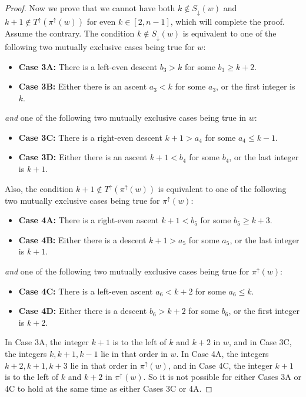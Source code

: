 \documentclass[11pt]{amsart}
\theoremstyle{definition}
\begin{document}
\begin{proof}
    Now we prove that we cannot have both $k\not\in S_\downarrow(w)$ and $k+1\not\in T^\uparrow(\pi^\uparrow(w))$ for even $k\in [2,n-1]$, which will complete the proof. Assume the contrary. The condition $k\not\in S_\downarrow(w)$ is equivalent to one of the following two mutually exclusive cases being true for $w$:
    \begin{itemize}
        \item \textbf{Case 3A: } There is a left-even descent $b_3>k$ for some $b_3\ge k+2$.
        \item \textbf{Case 3B: } Either there is an ascent $a_3<k$ for some $a_3$, or the first integer is $k$.
    \end{itemize}
    \emph{and} one of the following two mutually exclusive cases being true in $w$:
    \begin{itemize}
        \item \textbf{Case 3C: } There is a right-even descent $k+1>a_4$ for some $a_4\le k-1$.
        \item \textbf{Case 3D: } Either there is an ascent $k+1<b_4$ for some $b_4$, or the last integer is $k+1$.
    \end{itemize}
    Also, the condition $k+1\not\in T^\uparrow(\pi^\uparrow(w))$ is equivalent to one of the following two mutually exclusive cases being true for $\pi^\uparrow(w)$:
    \begin{itemize}
        \item \textbf{Case 4A: } There is a right-even ascent $k+1<b_5$ for some $b_5\ge k+3$.
        \item \textbf{Case 4B: } Either there is a descent $k+1>a_5$ for some $a_5$, or the last integer is $k+1$.
    \end{itemize}
    \emph{and} one of the following two mutually exclusive cases being true for $\pi^\uparrow(w)$:
    \begin{itemize}
        \item \textbf{Case 4C: } There is a left-even ascent $a_6<k+2$ for some $a_6\le k$.
        \item \textbf{Case 4D: } Either there is a descent $b_6>k+2$ for some $b_6$, or the first integer is $k+2$.
    \end{itemize}
    
    In Case 3A, the integer $k+1$ is to the left of $k$ and $k+2$ in $w$, and in Case 3C, the integers $k,k+1,k-1$ lie in that order in $w$. In Case 4A, the integers $k+2, k+1, k+3$ lie in that order in $\pi^\uparrow(w)$, and in Case 4C, the integer $k+1$ is to the left of $k$ and $k+2$ in $\pi^\uparrow(w)$. So it is not possible for either Cases 3A or 4C to hold at the same time as either Cases 3C or 4A.
    

\end{proof}
\end{document}
